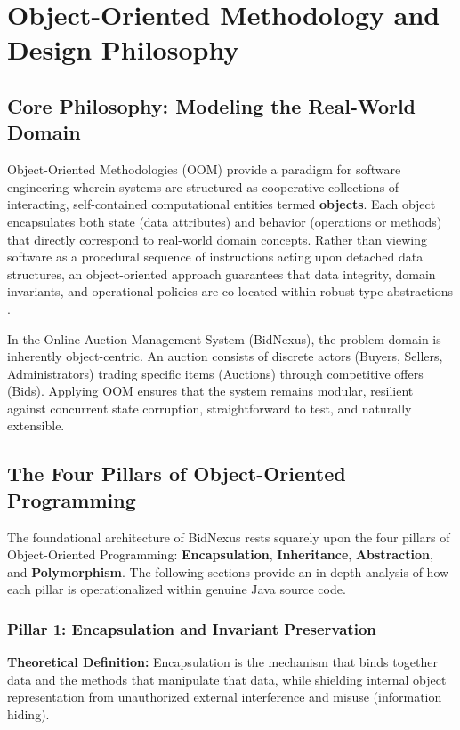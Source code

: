 \section{Object-Oriented Methodology and Design Philosophy}
\label{sec:oop_methodology}

\subsection{Core Philosophy: Modeling the Real-World Domain}
Object-Oriented Methodologies (OOM) provide a paradigm for software engineering wherein systems are structured as cooperative collections of interacting, self-contained computational entities termed \textbf{objects}. Each object encapsulates both state (data attributes) and behavior (operations or methods) that directly correspond to real-world domain concepts. Rather than viewing software as a procedural sequence of instructions acting upon detached data structures, an object-oriented approach guarantees that data integrity, domain invariants, and operational policies are co-located within robust type abstractions \cite{bloch2018effective, gamma1994design}.

In the Online Auction Management System (BidNexus), the problem domain is inherently object-centric. An auction consists of discrete actors (Buyers, Sellers, Administrators) trading specific items (Auctions) through competitive offers (Bids). Applying OOM ensures that the system remains modular, resilient against concurrent state corruption, straightforward to test, and naturally extensible.

\subsection{The Four Pillars of Object-Oriented Programming}
The foundational architecture of BidNexus rests squarely upon the four pillars of Object-Oriented Programming: \textbf{Encapsulation}, \textbf{Inheritance}, \textbf{Abstraction}, and \textbf{Polymorphism}. The following sections provide an in-depth analysis of how each pillar is operationalized within genuine Java source code.

\subsubsection{Pillar 1: Encapsulation and Invariant Preservation}
\textbf{Theoretical Definition:} Encapsulation is the mechanism that binds together data and the methods that manipulate that data, while shielding internal object representation from unauthorized external interference and misuse (information hiding). 

